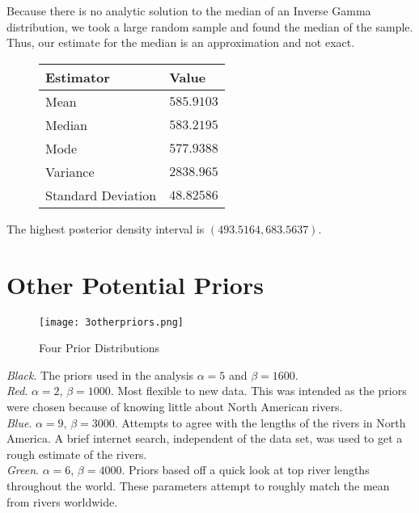 \documentclass[12pt]{article}
\begin{document}
\noindent Because there is no analytic solution to the median of an Inverse Gamma distribution, we took a large random sample and found the median of the sample.  Thus, our estimate for the median is an approximation and not exact.

\begin{figure}[H]
\begin{center}
\begin{tabular}{l|r}
Estimator & \multicolumn{1}{l}{Value} \\ \hline \hline
Mean & $585.9103$ \\
Median & $583.2195$ \\
Mode & $577.9388$ \\
Variance & $2838.965$ \\
Standard Deviation & $48.82586$ \\
\end{tabular}
\end{center}
\end{figure}

\noindent The highest posterior density interval is $(493.5164, 683.5637)$.

\section*{Other Potential Priors}

\begin{figure}[H]
\begin{center}
\texttt{[image: 3otherpriors.png]}
\caption{Four Prior Distributions}
\end{center}
\end{figure}

\noindent \textit{Black}.  The priors used in the analysis $\alpha=5$ and $\beta=1600$. \\ [-0.3cm]

\noindent \textit{Red}. $\alpha=2$, $\beta=1000$.  Most flexible to new data.  This was intended as the priors were chosen because of knowing little about North American rivers. \\ [-0.3cm]

\noindent \textit{Blue}. $\alpha=9$, $\beta=3000$.  Attempts to agree with the lengths of the rivers in North America.  A brief internet search, independent of the data set, was used to get a rough estimate of the rivers. \\ [-0.3cm]

\noindent \textit{Green}. $\alpha=6$, $\beta=4000$.  Priors based off a quick look at top river lengths throughout the world.  These parameters attempt to roughly match the mean from rivers worldwide.
\bigskip
\end{document}

